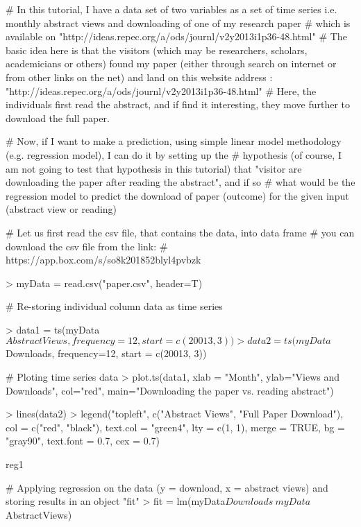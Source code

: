 # In this tutorial, I have a data set of two variables as a set of time series i.e. monthly abstract views and downloading of one of my research paper
# which is available on "http://ideas.repec.org/a/ods/journl/v2y2013i1p36-48.html"
# The basic idea here is that the visitors (which may be researchers, scholars, academicians or others) found my paper (either through search on internet or from other links on the net) and land on this website address : "http://ideas.repec.org/a/ods/journl/v2y2013i1p36-48.html"
# Here, the individuals first read the abstract, and if find it interesting, they move further to download the full paper.

# Now, if I want to make a prediction, using simple linear model methodology (e.g. regression model), I can do it by setting up the 
# hypothesis (of course, I am not going to test that hypothesis in this tutorial) that "visitor are downloading the paper after reading the abstract", and if so
# what would be the regression model to predict the download of paper (outcome) for the given input (abstract view or reading)

# Let us first read the csv file, that contains the data, into data frame
# you can download the csv file from the link:
# https://app.box.com/s/so8k201852blyl4pvbzk

> myData = read.csv("paper.csv", header=T) 

# Re-storing individual column data as time series 

> data1 = ts(myData$AbstractViews, frequency=12, start = c(20013, 3))> data2 = ts(myData$Downloads, frequency=12, start = c(20013, 3)) 

# Ploting time series data 
> plot.ts(data1, xlab = "Month", ylab="Views and Downloads", col="red", main="Downloading the paper vs. reading abstract") 

> lines(data2) > legend("topleft", c("Abstract Views", "Full Paper Download"), col = c("red", "black"), text.col = "green4", lty = c(1, 1), merge = TRUE, bg = "gray90", text.font = 0.7, cex = 0.7)


reg1
 

# Applying regression on the data (y = download, x = abstract views) and storing results in an object "fit"
> fit = lm(myData$Downloads ~ myData$AbstractViews)


